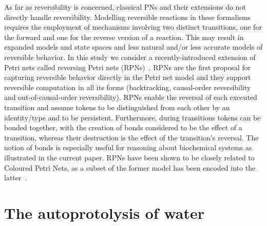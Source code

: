 \documentclass[runningheads]{llncs}
\begin{document}
As far as reversibility is concerned, classical PNs and their extensions do not
directly handle reversibility. Modelling reversible reactions in these formalisms requires the employment
of mechanisms involving two distinct transitions,
one for the forward and one for the reverse version of a reaction. This
may result in expanded models and state spaces and less natural and/or less accurate
models of  reversible behavior. In this study we consider
a recently-introduced extension of Petri nets called reversing Petri nets (RPNs)~\cite{RPNs}.
RPNs are the first proposal for capturing reversible behavior directly in the Petri net model
and they support reversible computation in all its forms
(backtracking, causal-order reversibility and out-of-causal-order reversibility).
RPNs  enable the reversal of each executed transition and assume tokens to be distinguished from each 
other by an identity/type and to be persistent. Furthermore,
during transitions tokens can be bonded together, with  the creation of bonds
 considered to be the effect of a transition, whereas their destruction is the effect of
the transition's reversal. The notion of bonds is especially useful for reasoning about biochemical
systems as illustrated in the current paper. %
RPNs have been shown to be closely related to Coloured Petri Nets, as a subset of the former model
has been encoded into the latter~\cite{RPNtoCPN}.

\section{The autoprotolysis of water}
\end{document}
